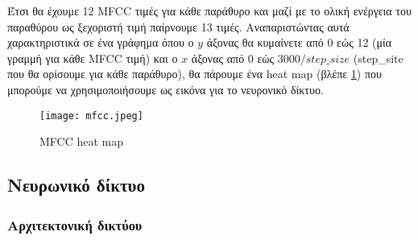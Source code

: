 Έτσι θα έχουμε 12 MFCC τιμές για κάθε παράθυρο και μαζί με το ολική ενέργεια
του παραθύρου ως ξεχοριστή τιμή παίρνουμε 13 τιμές. Αναπαριστώντας αυτά
χαρακτηριστικά σε ένα γράφημα όπου ο $y$ άξονας θα κυμαίνετε από 0 εώς 12 (μία
γραμμή για κάθε MFCC τιμή) και ο $x$ άξονας από 0 εώς $3000 / step\_size$
(step\_site που θα ορίσουμε για κάθε παράθυρο), θα πάρουμε ένα heat map (βλέπε
\ref{mfcc}) που μπορούμε να χρησιμοποιήσουμε ως εικόνα για το νευρονικό δίκτυο.

\begin{figure}[H]
  \center
	\texttt{[image: mfcc.jpeg]}
	\caption{MFCC heat map}
	\label{mfcc}
\end{figure}

\subsection{Νευρωνικό δίκτυο}
\subsubsection{Αρχιτεκτονική δικτύου}
